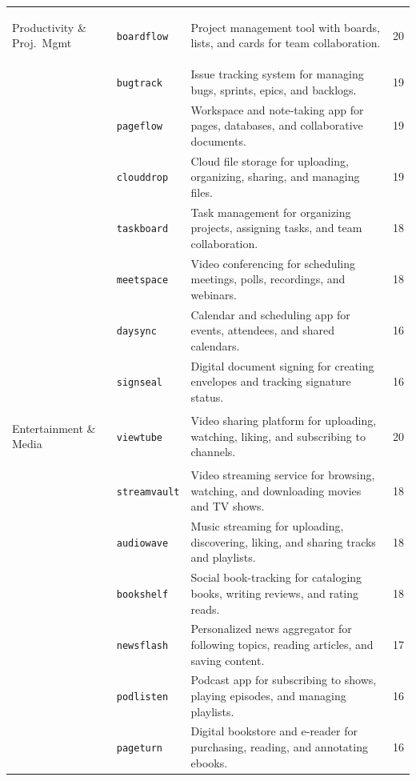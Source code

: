 \documentclass[11pt]{article}
\newcommand{\app}[1]{\texttt{#1}}
\begin{document}
{\begin{longtable}{@{}>{\bfseries\raggedright\arraybackslash}p{2.65cm} >{\raggedright\arraybackslash}p{2.55cm} >{\raggedright\arraybackslash}p{8.30cm} r@{}}
Productivity \& Proj.\ Mgmt
  & \app{boardflow}  & Project management tool with boards, lists, and cards for team collaboration.             & 20 \\
  & \app{bugtrack}   & Issue tracking system for managing bugs, sprints, epics, and backlogs.                    & 19 \\
  & \app{pageflow}   & Workspace and note-taking app for pages, databases, and collaborative documents.           & 19 \\
  & \app{clouddrop}  & Cloud file storage for uploading, organizing, sharing, and managing files.                 & 19 \\
  & \app{taskboard}  & Task management for organizing projects, assigning tasks, and team collaboration.          & 18 \\
  & \app{meetspace}  & Video conferencing for scheduling meetings, polls, recordings, and webinars.               & 18 \\
  & \app{daysync}    & Calendar and scheduling app for events, attendees, and shared calendars.                   & 16 \\
  & \app{signseal}   & Digital document signing for creating envelopes and tracking signature status.             & 16 \\
\midrule

Entertainment \& Media
  & \app{viewtube}    & Video sharing platform for uploading, watching, liking, and subscribing to channels.      & 20 \\
  & \app{streamvault} & Video streaming service for browsing, watching, and downloading movies and TV shows.      & 18 \\
  & \app{audiowave}   & Music streaming for uploading, discovering, liking, and sharing tracks and playlists.     & 18 \\
  & \app{bookshelf}   & Social book-tracking for cataloging books, writing reviews, and rating reads.             & 18 \\
  & \app{newsflash}   & Personalized news aggregator for following topics, reading articles, and saving content.  & 17 \\
  & \app{podlisten}   & Podcast app for subscribing to shows, playing episodes, and managing playlists.           & 16 \\
  & \app{pageturn}    & Digital bookstore and e-reader for purchasing, reading, and annotating ebooks.            & 16 \\
\midrule


\end{longtable}}
\end{document}
